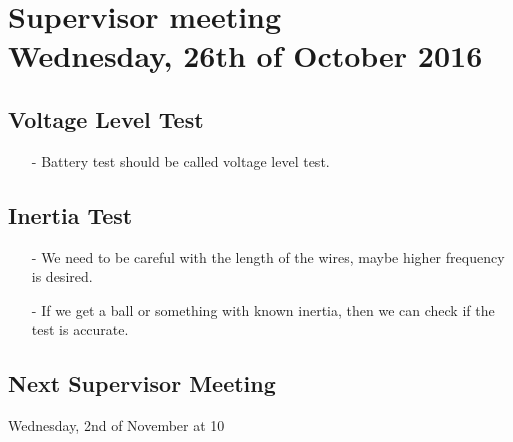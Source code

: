 
\renewcommand{\vec}[1]{\boldsymbol{\mathbf{#1}}}

\renewcommand\chaptername{KAPITEL}
\renewcommand\contentsname{Indhold}
\renewcommand\figurename{Figur}
\renewcommand\tablename{Tabel}

\section*{Supervisor meeting\\ \small Wednesday, 26th of October 2016}
\subsection{Voltage Level Test}
\begin{itemize}
	\item[-] Battery test should be called voltage level test. 
\end{itemize}
\subsection{Inertia Test}
\begin{itemize}
	\item[-] We need to be careful with the length of the wires, maybe higher frequency is desired. 
	\item[-] If we get a ball or something with known inertia, then we can check if the test is accurate.
\end{itemize}
\subsection{Next Supervisor Meeting}
Wednesday, 2nd of November at 10
